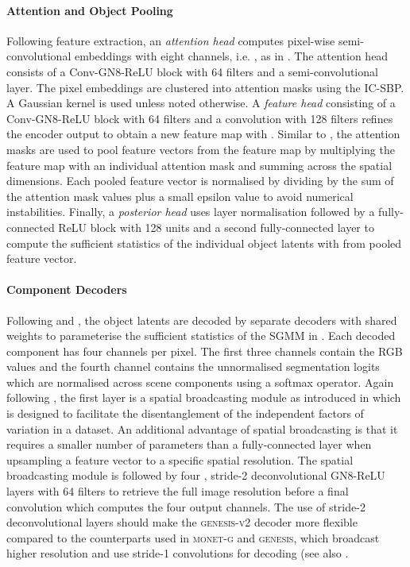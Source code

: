 \documentclass{article}
\begin{document}
\paragraph{Attention and Object Pooling}
Following feature extraction, an \emph{attention head} computes pixel-wise semi-convolutional embeddings  with eight channels, i.e. , as in \citet{novotny2018semi}.
The attention head consists of a  Conv-GN8-ReLU block with 64 filters and a  semi-convolutional layer.
The pixel embeddings are clustered into  attention masks  using the IC-SBP.
A Gaussian kernel  is used unless noted otherwise.
A \emph{feature head} consisting of a  Conv-GN8-ReLU block with 64 filters and a  convolution with 128 filters refines the encoder output  to obtain a new feature map  with .
Similar to \citet{locatello2020object}, the attention masks  are used to pool feature vectors from the feature map  by multiplying the feature map with an individual attention mask and summing across the spatial dimensions.
Each pooled feature vector is normalised by dividing by the sum of the attention mask values plus a small epsilon value to avoid numerical instabilities.
Finally, a \emph{posterior head} uses layer normalisation \citep{ba2016layer} followed by a fully-connected ReLU block with 128 units and a second fully-connected layer to compute the sufficient statistics of the individual object latents  with  from pooled feature vector.

\paragraph{Component Decoders}
Following \citet{greff2019multi} and \citet{locatello2020object}, the object latents are decoded by separate decoders with shared weights to parameterise the sufficient statistics of the SGMM in .
Each decoded component has four channels per pixel.
The first three channels contain the RGB values and the fourth channel contains the unnormalised segmentation logits which are normalised across scene components using a softmax operator. 
Again following \citet{locatello2020object}, the first layer is a spatial broadcasting module as introduced in \citet{watters2019spatial} which is designed to facilitate the disentanglement of the independent factors of variation in a dataset.
An additional advantage of spatial broadcasting is that it requires a smaller number of parameters than a fully-connected layer when upsampling a feature vector to a specific spatial resolution.
The spatial broadcasting module is followed by four , stride-2 deconvolutional GN8-ReLU layers with 64 filters to retrieve the full image resolution before a final  convolution which computes the four output channels.
The use of stride-2 deconvolutional layers should make the \textsc{genesis-v2} decoder more flexible compared to the counterparts used in \textsc{monet-g} and \textsc{genesis}, which broadcast higher resolution and use stride-1 convolutions for decoding (see also \cite{engelcke2020reconstruction}.
\end{document}
